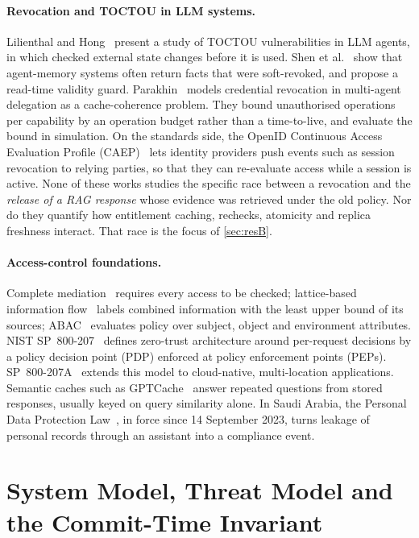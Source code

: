 \documentclass[10pt]{article}
\begin{document}
\paragraph{Revocation and TOCTOU in LLM systems.}
Lilienthal and Hong~\cite{lilienthal2025toctou} present a study of TOCTOU vulnerabilities in LLM agents, in which checked external state changes before it is used. Shen et al.~\cite{shen2026revoked} show that agent-memory systems often return facts that were soft-revoked, and propose a read-time validity guard. Parakhin~\cite{parakhin2026} models credential revocation in multi-agent delegation as a cache-coherence problem. They bound unauthorised operations per capability by an operation budget rather than a time-to-live, and evaluate the bound in simulation. On the standards side, the OpenID Continuous Access Evaluation Profile (CAEP)~\cite{caep2025} lets identity providers push events such as session revocation to relying parties, so that they can re-evaluate access while a session is active. None of these works studies the specific race between a revocation and the \emph{release of a RAG response} whose evidence was retrieved under the old policy. Nor do they quantify how entitlement caching, rechecks, atomicity and replica freshness interact. That race is the focus of \cref{sec:resB}.

\paragraph{Access-control foundations.}
Complete mediation~\cite{saltzer1975} requires every access to be checked; lattice-based information flow~\cite{denning1976} labels combined information with the least upper bound of its sources; ABAC~\cite{nist800162} evaluates policy over subject, object and environment attributes. NIST SP~800-207~\cite{nist800207} defines zero-trust architecture around per-request decisions by a policy decision point (PDP) enforced at policy enforcement points (PEPs). SP~800-207A~\cite{nist800207a} extends this model to cloud-native, multi-location applications. Semantic caches such as GPTCache~\cite{bang2023gptcache} answer repeated questions from stored responses, usually keyed on query similarity alone. In Saudi Arabia, the Personal Data Protection Law~\cite{pdpl2023}, in force since 14 September 2023, turns leakage of personal records through an assistant into a compliance event.

\section{System Model, Threat Model and the Commit-Time Invariant}
\label{sec:model}
\end{document}
